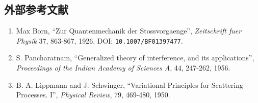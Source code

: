 \documentclass[
  xelatex,
  ja=standard]{bxjsarticle}
\providecommand{\tightlist}{%
  \setlength{\itemsep}{0pt}\setlength{\parskip}{0pt}}
\begin{document}
\subsection{外部参考文献}\label{ux5916ux90e8ux53c2ux8003ux6587ux732e}

\begin{enumerate}
\def\labelenumi{\arabic{enumi}.}
\setcounter{enumi}{6}
\tightlist
\item
  Max Born, ``Zur Quantenmechanik der Stossvorgaenge'',
  \emph{Zeitschrift fuer Physik} 37, 863-867, 1926. DOI:
  \texttt{10.1007/BF01397477}.
\item
  S. Pancharatnam, ``Generalized theory of interference, and its
  applications'', \emph{Proceedings of the Indian Academy of Sciences
  A}, 44, 247-262, 1956.
\item
  B. A. Lippmann and J. Schwinger, ``Variational Principles for
  Scattering Processes. I'', \emph{Physical Review}, 79, 469-480, 1950.
\end{enumerate}
\end{document}
